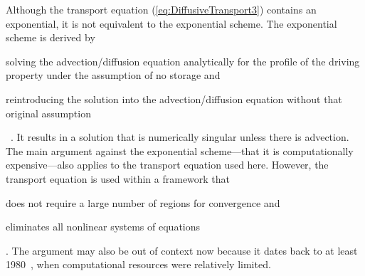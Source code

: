 Although the transport equation (\ref{eq:DiffusiveTransport3}) contains an exponential, it is not equivalent to the exponential scheme.  The exponential scheme is derived by \begin{inparaenum}[(1)]\item solving the advection\slash{}diffusion equation analytically for the profile of the driving property under the assumption of no storage and \item reintroducing the solution into the advection\slash{}diffusion equation without that original assumption\end{inparaenum}~\cite{Patankar1980, Majumdar2005}.  It results in a solution that is numerically singular unless there is advection.  The main argument against the exponential scheme---that it is computationally expensive---also applies to the transport equation used here.  However, the transport equation is used within a framework that \begin{inparaenum}[(1)]\item does not require a large number of regions for convergence and \item eliminates all nonlinear systems of equations\end{inparaenum}.  The argument may also be out of context now because it dates back to at least 1980~\cite{Patankar1980}, when computational resources were relatively limited.

